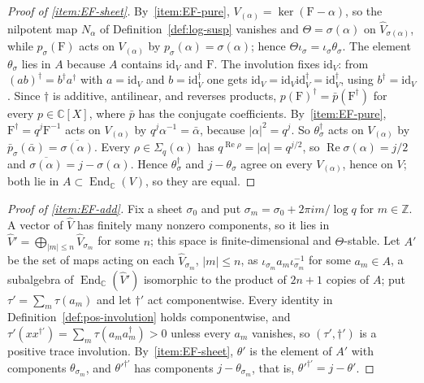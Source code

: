 \documentclass[11pt]{amsart}
\theoremstyle{plain}
\theoremstyle{definition}
\theoremstyle{remark}
\numberwithin{equation}{section}
\newcommand{\C}{\mathbb{C}}
\newcommand{\Z}{\mathbb{Z}}
\DeclareMathOperator{\Rea}{Re}
\renewcommand{\Re}{\Rea}
\begin{document}
\begin{proof}[Proof of \ref{item:EF-sheet}]
By~\ref{item:EF-pure}, $V_{(\alpha)}=\ker(\mathrm{F}-\alpha)$, so the
nilpotent map $N_\alpha$ of Definition~\ref{def:log-susp} vanishes and
$\Theta=\sigma(\alpha)$ on $\widehat V_{\sigma(\alpha)}$, while
$p_\sigma(\mathrm{F})$ acts on $V_{(\alpha)}$ by
$p_\sigma(\alpha)=\sigma(\alpha)$; hence
$\Theta\iota_\sigma=\iota_\sigma\theta_\sigma$. The element
$\theta_\sigma$ lies in $A$ because $A$ contains $\mathrm{id}_V$ and
$\mathrm{F}$. The involution fixes $\mathrm{id}_V$: from
$(ab)^\dagger=b^\dagger a^\dagger$ with $a=\mathrm{id}_V$ and
$b=\mathrm{id}_V^\dagger$ one gets $\mathrm{id}_V=\mathrm{id}_V
\mathrm{id}_V^\dagger=\mathrm{id}_V^\dagger$, using
$b^\dagger=\mathrm{id}_V$. Since $\dagger$ is additive, antilinear, and
reverses products, $p(\mathrm{F})^\dagger=\bar p(\mathrm{F}^\dagger)$
for every $p\in\C[X]$, where $\bar p$ has the conjugate coefficients.
By~\ref{item:EF-pure}, $\mathrm{F}^\dagger=q^j\mathrm{F}^{-1}$ acts on
$V_{(\alpha)}$ by $q^j\alpha^{-1}=\bar\alpha$, because
$|\alpha|^2=q^j$. So $\theta_\sigma^\dagger$ acts on $V_{(\alpha)}$ by
$\bar p_\sigma(\bar\alpha)=\overline{\sigma(\alpha)}$. Every
$\rho\in\Sigma_q(\alpha)$ has $q^{\Re\rho}=|\alpha|=q^{j/2}$, so
$\Re\sigma(\alpha)=j/2$ and $\overline{\sigma(\alpha)}=j-\sigma(\alpha)$.
Hence $\theta_\sigma^\dagger$ and $j-\theta_\sigma$ agree on every
$V_{(\alpha)}$, hence on $V$; both lie in
$A\subset\operatorname{End}_\C(V)$, so they are equal.
\end{proof}

\begin{proof}[Proof of \ref{item:EF-add}]
Fix a sheet $\sigma_0$ and put $\sigma_m=\sigma_0+2\pi im/\log q$ for
$m\in\Z$. A vector of $\widehat V$ has finitely many nonzero components,
so it lies in $\widehat V'=\bigoplus_{|m|\le n}\widehat V_{\sigma_m}$ for
some $n$; this space is finite-dimensional and $\Theta$-stable. Let
$A'$ be the set of maps acting on each $\widehat V_{\sigma_m}$,
$|m|\le n$, as $\iota_{\sigma_m}a_m\iota_{\sigma_m}^{-1}$ for some
$a_m\in A$, a subalgebra of $\operatorname{End}_\C(\widehat V')$
isomorphic to the product of $2n+1$ copies of $A$; put
$\tau'=\sum_m\tau(a_m)$ and let $\dagger'$ act componentwise. Every
identity in Definition~\ref{def:pos-involution} holds componentwise,
and $\tau'(xx^{\dagger'})=\sum_m\tau(a_ma_m^\dagger)>0$ unless every
$a_m$ vanishes, so $(\tau',\dagger')$ is a positive trace involution.
By~\ref{item:EF-sheet}, $\theta'$ is the element of $A'$ with
components $\theta_{\sigma_m}$, and $\theta'^{\dagger'}$ has components
$j-\theta_{\sigma_m}$, that is, $\theta'^{\dagger'}=j-\theta'$.
\end{proof}
\end{document}
